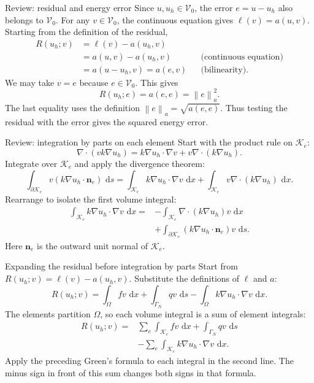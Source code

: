 \documentclass[11pt,aspectratio=169]{beamer}
\newcommand{\dd}{\,\mathrm{d}}
\newcommand{\Om}{\Omega}
\newcommand{\GamN}{\Gamma_N}
\newcommand{\Vzero}{\mathcal V_0}
\newcommand{\norm}[2][]{\left\lVert#2\right\rVert_{#1}}
\newcommand{\grad}{\nabla}
\newcommand{\divg}{\nabla\!\cdot}
\newcommand{\bn}{\bm n}
\begin{document}
\begin{frame}{Review: residual and energy error}
Since $u,u_h\in\Vzero$, the error $e=u-u_h$ also belongs to $\Vzero$.
For any $v\in\Vzero$, the continuous equation gives $\ell(v)=a(u,v)$.
Starting from the definition of the residual,
\[
\begin{aligned}
 R(u_h;v)
 &=\ell(v)-a(u_h,v)\\
 &=a(u,v)-a(u_h,v) &&\text{(continuous equation)}\\
 &=a(u-u_h,v)=a(e,v) &&\text{(bilinearity)}.
\end{aligned}
\]
We may take $v=e$ because $e\in\Vzero$. This gives
\[
 \boxed{R(u_h;e)=a(e,e)=\norm[a]{e}^2.}
\]
The last equality uses the definition $\norm[a]{e}=\sqrt{a(e,e)}$.
Thus testing the residual with the error gives the squared energy error.
\end{frame}

\begin{frame}{Review: integration by parts on each element}
Start with the product rule on $\mathcal K_e$:
\[
 \divg(vk\grad u_h)
 =k\grad u_h\cdot\grad v+v\divg(k\grad u_h).
\]
Integrate over $\mathcal K_e$ and apply the divergence theorem:
\[
 \int_{\partial\mathcal K_e}v(k\grad u_h\cdot\bn_e)\,\dd s
 =\int_{\mathcal K_e}k\grad u_h\cdot\grad v\,\dd x
  +\int_{\mathcal K_e}v\divg(k\grad u_h)\,\dd x.
\]
Rearrange to isolate the first volume integral:
\[
\begin{aligned}
 \int_{\mathcal K_e}k\grad u_h\cdot\grad v\,\dd x
 ={}&-\int_{\mathcal K_e}\divg(k\grad u_h)v\,\dd x\\
 &+\int_{\partial\mathcal K_e}
 (k\grad u_h\cdot\bn_e)v\,\dd s.
\end{aligned}
\]
Here $\bn_e$ is the outward unit normal of $\mathcal K_e$.
\end{frame}

\begin{frame}{Expanding the residual before integration by parts}
Start from $R(u_h;v)=\ell(v)-a(u_h,v)$. Substitute the definitions of
$\ell$ and $a$:
\[
 R(u_h;v)=\int_\Om fv\,\dd x+\int_{\GamN}qv\,\dd s
          -\int_\Om k\grad u_h\cdot\grad v\,\dd x.
\]
The elements partition $\Om$, so each volume integral is a sum of element
integrals:
\[
\begin{aligned}
 R(u_h;v)={}&\sum_e\int_{\mathcal K_e}fv\,\dd x
       +\int_{\GamN}qv\,\dd s\\
 &-\sum_e\int_{\mathcal K_e}k\grad u_h\cdot\grad v\,\dd x.
\end{aligned}
\]
Apply the preceding Green's formula to each integral in the second line.
The minus sign in front of this sum changes both signs in that formula.
\end{frame}
\end{document}
